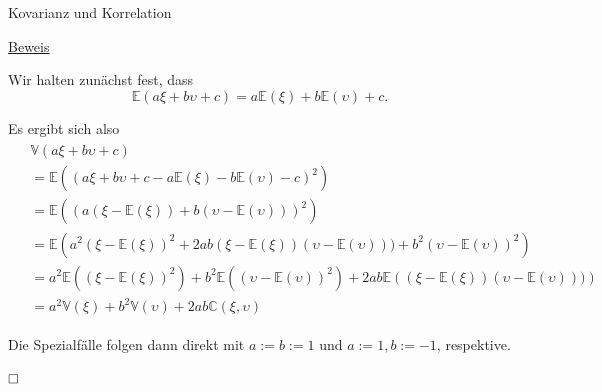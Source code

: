 \documentclass[
  8pt,
  ignorenonframetext,
]{beamer}
\newcommand{\ups}{\upsilon}
\begin{document}
\begin{frame}{Kovarianz und Korrelation}
\protect\hypertarget{kovarianz-und-korrelation-5}{}
\footnotesize

\underline{Beweis} \vspace{2mm}

Wir halten zunächst fest, dass \begin{equation}
\mathbb{E}(a\xi + b\ups + c) = a\mathbb{E}(\xi) + b\mathbb{E}(\ups) + c.
\end{equation}

Es ergibt sich also \begin{align}
\begin{split}
& \mathbb{V}(a\xi + b\ups + c)                                                              \\
& = \mathbb{E}\left((a\xi + b\ups + c - a\mathbb{E}(\xi) - b\mathbb{E}(\ups) - c)^2\right)  \\
& = \mathbb{E}\left((a(\xi  - \mathbb{E}(\xi)) + b(\ups  - \mathbb{E}(\ups)))^2\right)      \\
& = \mathbb{E}\left(a^2(\xi - \mathbb{E}(\xi))^2
                  + 2ab(\xi - \mathbb{E}(\xi))(\ups - \mathbb{E}(\ups)))
                  + b^2(\ups - \mathbb{E}(\ups))^2
                  \right)               \\
& = a^2\mathbb{E}\left((\xi - \mathbb{E}(\xi))^2\right)
  + b^2\mathbb{E}\left((\ups - \mathbb{E}(\ups))^2\right)
  + 2ab\mathbb{E}\left((\xi - \mathbb{E}(\xi))(\ups - \mathbb{E}(\ups)))\right)                 \\
& = a^2\mathbb{V}(\xi)+ b^2\mathbb{V}(\ups) + 2ab\mathbb{C}(\xi,\ups)
\end{split}
\end{align}

Die Spezialfälle folgen dann direkt mit \(a := b := 1\) und
\(a := 1, b := -1\), respektive.

\(\hfill \Box\)
\end{frame}
\end{document}

